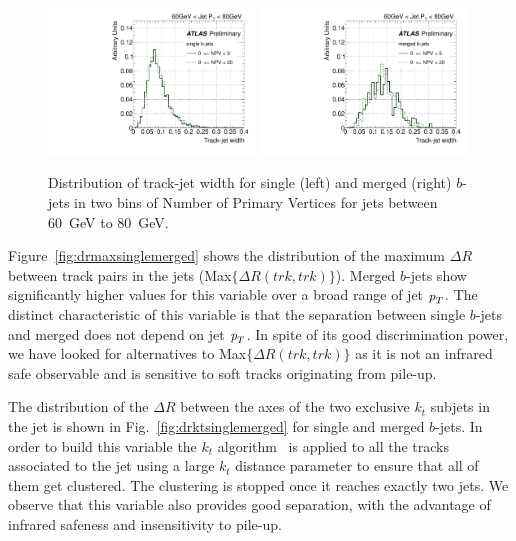 \begin{figure}[tp]
\centering
\includegraphics[width=0.49\textwidth]{FIGS/systematics/trkWidthsingle_060.pdf}
\includegraphics[width=0.49\textwidth]{FIGS/systematics/trkWidthmerged_060.pdf}
\caption{Distribution of track-jet width for single (left) and merged (right) $b$-jets in two bins of Number of Primary Vertices for jets between 60~GeV to 80~GeV.}
\label{fig:trkwidthpileup}
\end{figure}


Figure~\ref{fig:drmaxsinglemerged} shows the distribution of the maximum $\Delta R$ between track pairs in the jets (Max$\{\Delta R(trk,trk)\}$). Merged $b$-jets show significantly higher values for this variable over a broad range of jet ${\emph{p}_{T}}$. The distinct characteristic of this variable is that the separation between single $b$-jets and merged does not depend on jet ${\emph{p}_{T}}$. In spite of its good discrimination power, we have looked for alternatives to Max$\{\Delta R(trk,trk)\}$ as it is not an infrared safe observable and is sensitive to soft tracks originating from pile-up. 

The distribution of the $\Delta R$ between the axes of the two exclusive $k_t$ subjets in the jet is shown in Fig.~\ref{fig:drktsinglemerged} for single and merged $b$-jets. In order to build this variable the $k_t$ algorithm~\cite{kt1} is applied to all the tracks associated to the jet using a large $k_t$  distance parameter to ensure that all of them get clustered. The clustering is stopped once it reaches exactly two jets. We observe that this variable also provides good separation, with the advantage of infrared safeness and insensitivity to pile-up. %


